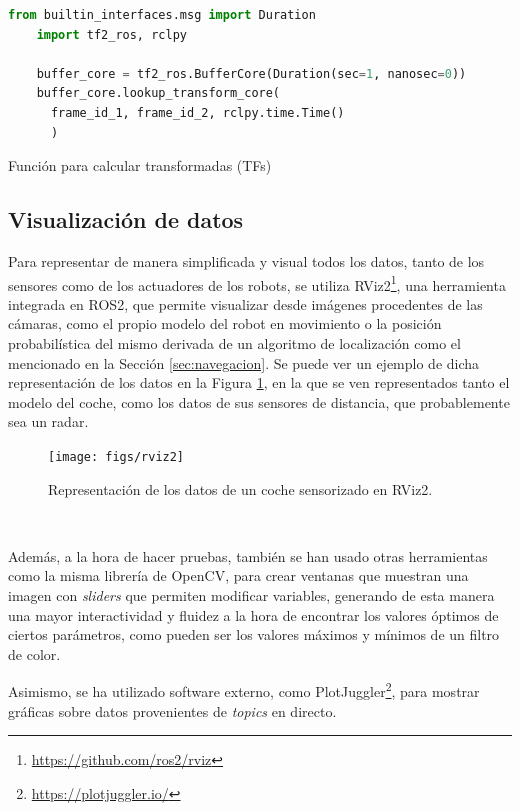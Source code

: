 \begin{code}[h!]
  \begin{lstlisting}[language=Python]
    from builtin_interfaces.msg import Duration
    import tf2_ros, rclpy

    buffer_core = tf2_ros.BufferCore(Duration(sec=1, nanosec=0))
    buffer_core.lookup_transform_core(
      frame_id_1, frame_id_2, rclpy.time.Time()
      )
  \end{lstlisting}
  \caption[Función para calcular transformadas]{Función para calcular transformadas (TFs)}
  \label{cod:code_tfs}
\end{code}


\subsection{Visualización de datos}
\label{sec:visualizacion_datos}

Para representar de manera simplificada y visual todos los datos, tanto de los
sensores como de los actuadores de los robots, se utiliza
RViz2\footnote{\url{https://github.com/ros2/rviz}}, una herramienta integrada en
ROS2, que permite visualizar desde imágenes procedentes de las cámaras, como el
propio modelo del robot en movimiento o la posición probabilística del mismo
derivada de un algoritmo de localización como el mencionado en la Sección
\ref{sec:navegacion}.
Se puede ver un ejemplo de dicha representación de los datos en la Figura
\ref{fig:rviz2}, en la que se ven representados tanto el modelo del coche, como
los datos de sus sensores de distancia, que probablemente sea un radar.

\begin{figure} [h!]
  \begin{center}
    \texttt{[image: figs/rviz2]}
  \end{center}
  \caption{Representación de los datos de un coche sensorizado en RViz2.}
  \label{fig:rviz2}
\end{figure}\

Además, a la hora de hacer pruebas, también se han usado otras herramientas como
la misma librería de OpenCV, para crear ventanas que muestran una imagen con
\textit{sliders} que permiten modificar variables, generando de esta manera una
mayor interactividad y fluidez a la hora de encontrar los valores óptimos de
ciertos parámetros, como pueden ser los valores máximos y mínimos de un filtro
de color.

Asimismo, se ha utilizado software externo, como
PlotJuggler\footnote{\url{https://plotjuggler.io/}}, para mostrar gráficas sobre
datos provenientes de \textit{topics} en directo.


